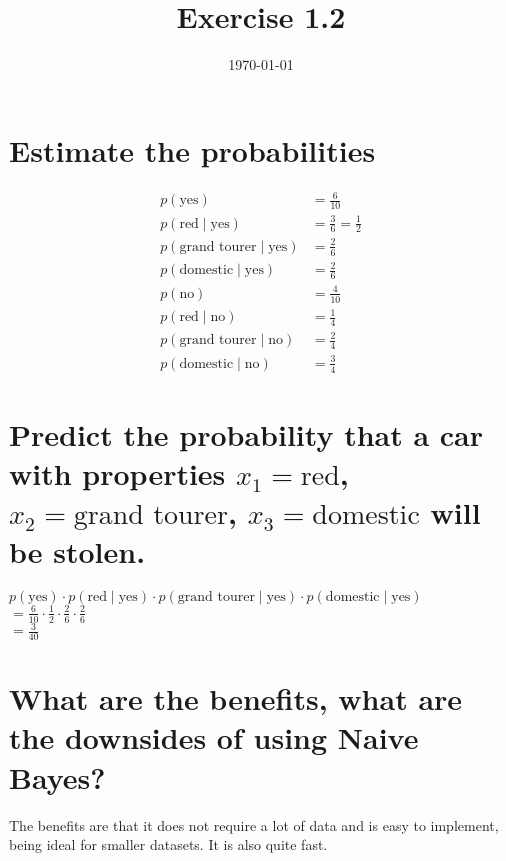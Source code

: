 \documentclass{article}
\title{Exercise 1.2}
\date{\today}
\begin{document}
\maketitle

\section{Estimate the probabilities}

\begin{align}
    p(\text{yes}) &= \frac{6}{10} \\
    p(\text{red} \mid \text{yes}) &= \frac{3}{6} = \frac{1}{2} \\
    p(\text{grand tourer} \mid \text{yes}) &= \frac{2}{6} \\
    p(\text{domestic} \mid \text{yes}) &= \frac{2}{6} \\
    p(\text{no}) &= \frac{4}{10} \\
    p(\text{red} \mid \text{no}) &= \frac{1}{4} \\
    p(\text{grand tourer} \mid \text{no}) &= \frac{2}{4} \\
    p(\text{domestic} \mid \text{no}) &= \frac{3}{4}
\end{align}

\section{Predict the probability that a car with properties \( x_1 = \text{red} \), \( x_2 = \text{grand tourer} \), \( x_3 = \text{domestic} \) will be stolen.
}

\begin{center}
    \( p(\text{yes}) \cdot p(\text{red} \mid \text{yes}) \cdot p(\text{grand tourer} \mid \text{yes}) \cdot p(\text{domestic} \mid \text{yes}) \) \\
    \( = \frac{6}{10} \cdot \frac{1}{2} \cdot \frac{2}{6} \cdot \frac{2}{6} \) \\
    \( = \frac{3}{40} \)
\end{center}

\section{What are the benefits, what are the downsides of using Naive
Bayes?}

The benefits are that it does not require a lot of data and is easy to implement, being ideal for smaller datasets. It is also quite fast.
\end{document}
